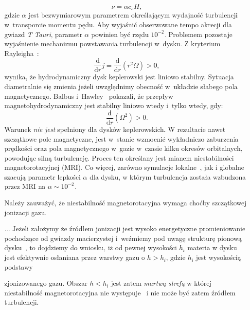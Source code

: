 \begin{equation}\label{eq:alpha}
\nu = \alpha c_s H,
\end{equation}
%
gdzie $\alpha$ jest bezwymiarowym parametrem określającym wydajność
turbulencji w~transporcie momentu pędu. Aby wyjaśnić obserwowane tempo akrecji
dla gwiazd \emph{T Tauri}, parametr $\alpha$ powinien być rzędu $10^{-2}$.
Problemem pozostaje wyjaśnienie mechanizmu powstawania turbulencji w~dysku. Z
kryterium Rayleigha~\cite{C61}:
%
\begin{equation}
   \frac{\mathrm{d}}{\mathrm{d}r} j =
   \frac{\mathrm{d}}{\mathrm{d}r}\left(r^2\Omega\right) > 0,
\end{equation}
%
wynika, że hydrodynamiczny dysk keplerowski jest liniowo stabilny. Sytuacja
diametralnie się zmienia jeżeli uwzględnimy obecność w~układzie 
słabego pola magnetycznego. Balbus i~Hawley~\citep{BH91} pokazali, że przepływ
magnetohydrodynamiczny jest stabilny liniowo wtedy i~tylko wtedy, gdy:
%
\begin{equation}\label{eq:mri}
   \frac{\mathrm{d}}{\mathrm{d}r}\left(\Omega^2\right) > 0.
\end{equation}
%
Warunek  \emph{nie jest} spełniony dla dysków keplerowskich. W
rezultacie nawet szczątkowe pole magnetyczne, jest w~stanie wzmocnić wykładniczo
zaburzenia prędkości oraz pola magnetycznego w~gazie w~czasie kilku okresów
orbitalnych, powodując silną
turbulencję. Proces ten określany jest mianem niestabilności magnetorotacyjnej
(MRI). Co więcej, zarówno symulacje lokalne~\cite{DSP10}, jak
i globalne~\cite{FD11} szacują parametr lepkości $\alpha$ dla dysku, w którym
turbulencja została wzbudzona przez MRI na $\alpha\sim 10^{-2}$.
\par Należy zauważyć, że niestabilność magnetorotacyjna wymaga choćby
szczątkowej jonizacji gazu. 

$\ldots$
Jeżeli założymy że źródłem jonizacji jest wysoko energetyczne
promieniowanie pochodzące od gwiazdy macierzystej i~weźmiemy pod uwagę strukturę
pionową dysku~, to dojdziemy do wniosku, iż od pewnej wysokości
$h_i$ materia w dysku jest efektywnie osłaniana przez warstwy gazu o $h > h_i$, gdzie
$h_i$ jest wysokością podstawy

zjonizowanego gazu. 
Obszar $h < h_i$ jest zatem \emph{martwą strefą}
w której niestabilność magnetorotacyjna nie występuje~\cite{DFT10} i nie może
być zatem źródłem turbulencji. 

